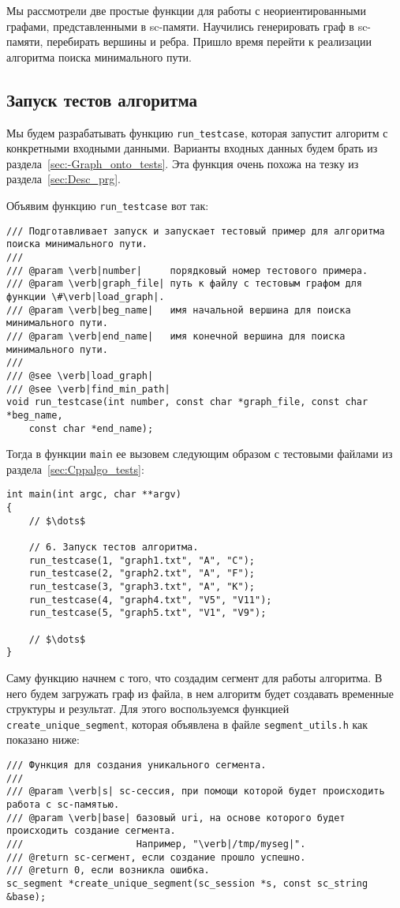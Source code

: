 Мы рассмотрели две простые функции для работы с неориентированными
графами, представленными в sc-памяти. Научились генерировать граф в
sc-памяти, перебирать вершины и ребра. Пришло время перейти к
реализации алгоритма поиска минимального пути.

\subsection{Запуск тестов алгоритма}
\label{sec:libscprg_run_testcase}

Мы будем разрабатывать функцию \lstinline|run_testcase|, которая
запустит алгоритм с конкретными входными данными. Варианты входных
данных будем брать из раздела~\ref{sec:-Graph_onto_tests}. Эта функция
очень похожа на тезку из раздела~\ref{sec:Desc_prg}.

Объявим функцию \lstinline|run_testcase| вот так:
\begin{lstlisting}[texcl]
/// Подготавливает запуск и запускает тестовый пример для алгоритма поиска минимального пути.
///
/// @param \verb|number|     порядковый номер тестового примера.
/// @param \verb|graph_file| путь к файлу с тестовым графом для функции \#\verb|load_graph|.
/// @param \verb|beg_name|   имя начальной вершина для поиска минимального пути.
/// @param \verb|end_name|   имя конечной вершина для поиска минимального пути.
///
/// @see \verb|load_graph|
/// @see \verb|find_min_path|
void run_testcase(int number, const char *graph_file, const char *beg_name,
    const char *end_name);
\end{lstlisting}

Тогда в функции \lstinline|main| ее вызовем следующим образом с
тестовыми файлами из раздела~\ref{sec:Cppalgo_tests}:
\begin{lstlisting}[texcl]
int main(int argc, char **argv)
{
    // $\dots$

    // 6. Запуск тестов алгоритма.
    run_testcase(1, "graph1.txt", "A", "C");
    run_testcase(2, "graph2.txt", "A", "F");
    run_testcase(3, "graph3.txt", "A", "K");
    run_testcase(4, "graph4.txt", "V5", "V11");
    run_testcase(5, "graph5.txt", "V1", "V9");

    // $\dots$
}
\end{lstlisting}

Саму функцию начнем с того, что создадим сегмент для работы
алгоритма. В него будем загружать граф из файла, в нем алгоритм будет
создавать временные структуры и результат. Для этого воспользуемся
функцией \lstinline|create_unique_segment|, которая объявлена в файле
\verb|segment_utils.h| как показано ниже:
\begin{lstlisting}[texcl]
/// Функция для создания уникального сегмента.
///
/// @param \verb|s| sc-сессия, при помощи которой будет происходить работа с sc-памятью.
/// @param \verb|base| базовый uri, на основе которого будет происходить создание сегмента.
///                    Например, "\verb|/tmp/myseg|".
/// @return sc-сегмент, если создание прошло успешно.
/// @return 0, если возникла ошибка.
sc_segment *create_unique_segment(sc_session *s, const sc_string &base);
\end{lstlisting}

